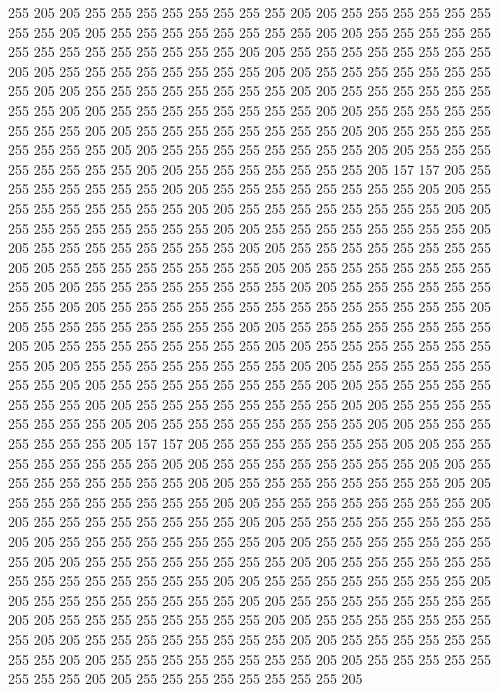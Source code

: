 255 205 205 255 255 255 255 255 255 255 255 205 205 255 255 255 255 255 255 255
255 205 205 255 255 255 255 255 255 255 255 205 205 255 255 255 255 255 255 255
255 255 255 255 255 255 255 205 205 255 255 255 255 255 255 255 255 205 205 255
255 255 255 255 255 255 255 205 205 255 255 255 255 255 255 255 255 205 205 255
255 255 255 255 255 255 255 205 205 255 255 255 255 255 255 255 255 205 205 255
255 255 255 255 255 255 255 205 205 255 255 255 255 255 255 255 255 205 205 255
255 255 255 255 255 255 255 205 205 255 255 255 255 255 255 255 255 205 205 255
255 255 255 255 255 255 255 205 205 255 255 255 255 255 255 255 255 205 205 255
255 255 255 255 255 255 205 157 157 205 255 255 255 255 255 255 255 205 205 255
255 255 255 255 255 255 255 205 205 255 255 255 255 255 255 255 255 205 205 255
255 255 255 255 255 255 255 205 205 255 255 255 255 255 255 255 255 205 205 255
255 255 255 255 255 255 255 205 205 255 255 255 255 255 255 255 255 205 205 255
255 255 255 255 255 255 255 205 205 255 255 255 255 255 255 255 255 205 205 255
255 255 255 255 255 255 255 205 205 255 255 255 255 255 255 255 255 205 205 255
255 255 255 255 255 255 255 205 205 255 255 255 255 255 255 255 255 255 255 255
255 255 255 205 205 255 255 255 255 255 255 255 255 205 205 255 255 255 255 255
255 255 255 205 205 255 255 255 255 255 255 255 255 205 205 255 255 255 255 255
255 255 255 205 205 255 255 255 255 255 255 255 255 205 205 255 255 255 255 255
255 255 255 205 205 255 255 255 255 255 255 255 255 205 205 255 255 255 255 255
255 255 255 205 205 255 255 255 255 255 255 255 255 205 205 255 255 255 255 255
255 255 255 205 205 255 255 255 255 255 255 255 255 205 205 255 255 255 255 255
255 255 205 157 157 205 255 255 255 255 255 255 255 205 205 255 255 255 255 255
255 255 255 205 205 255 255 255 255 255 255 255 255 205 205 255 255 255 255 255
255 255 255 205 205 255 255 255 255 255 255 255 255 205 205 255 255 255 255 255
255 255 255 205 205 255 255 255 255 255 255 255 255 205 205 255 255 255 255 255
255 255 255 205 205 255 255 255 255 255 255 255 255 205 205 255 255 255 255 255
255 255 255 205 205 255 255 255 255 255 255 255 255 205 205 255 255 255 255 255
255 255 255 205 205 255 255 255 255 255 255 255 255 255 255 255 255 255 255 205
205 255 255 255 255 255 255 255 255 205 205 255 255 255 255 255 255 255 255 205
205 255 255 255 255 255 255 255 255 205 205 255 255 255 255 255 255 255 255 205
205 255 255 255 255 255 255 255 255 205 205 255 255 255 255 255 255 255 255 205
205 255 255 255 255 255 255 255 255 205 205 255 255 255 255 255 255 255 255 205
205 255 255 255 255 255 255 255 255 205 205 255 255 255 255 255 255 255 255 205
